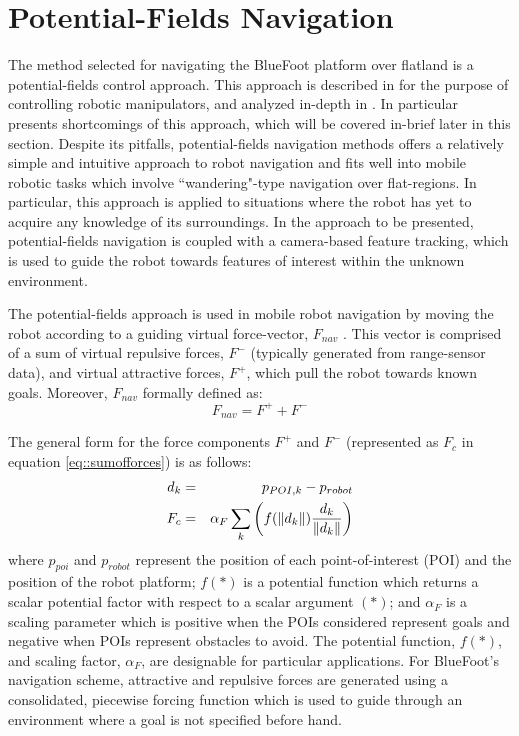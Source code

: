 	\section{Potential-Fields Navigation}

		The method selected for navigating the BlueFoot platform over flatland is a potential-fields control approach. This approach is described in \cite{Hogan1984} for the purpose of controlling robotic manipulators, and analyzed in-depth in \cite{Koren1991}. In particular \cite{Koren1991} presents shortcomings of this approach, which will be covered in-brief later in this section. Despite its pitfalls, potential-fields navigation methods offers a relatively simple and intuitive approach to robot navigation and fits well into mobile robotic tasks which involve ``wandering"-type navigation over flat-regions. In particular, this approach is applied to situations where the robot has yet to acquire any knowledge of its surroundings. In the approach to be presented, potential-fields navigation is coupled with a camera-based feature tracking, which is used to guide the robot towards features of interest within the unknown environment.

		The potential-fields approach is used in mobile robot navigation by moving the robot according to a guiding virtual force-vector, $F_{nav}$ \cite{Koren1991,ArambulaCosio2004}. This vector is comprised of a sum of virtual repulsive forces, $F^{-}$ (typically generated from range-sensor data), and virtual attractive forces, $F^{+}$, which pull the robot towards known goals. Moreover, $F_{nav}$ formally defined as:
		\begin{equation}
			F_{nav} = F^{+} + F^{-}
			\label{eq::sumofforces}
		\end{equation}

		The general form for the force components $F^{+}$ and $F^{-}$ (represented as $F_{c}$ in equation \ref{eq::sumofforces}) is as follows:
		\begin{eqnarray}
			d_{k} 	&=& p_{POI,k} - p_{robot} \nonumber\\
			F_{c}	&=& \alpha_{F}\sum_{k}\left( f(\left\lVert d_{k}\right\rVert)\frac{d_{k}}{\left\lVert d_{k}\right\rVert} \right)
			\label{eq::sumofforces}
		\end{eqnarray}	
		where $p_{poi}$ and $p_{robot}$ represent the position of each \Kth point-of-interest (POI) and the position of the robot platform; $f(*)$ is a potential function which returns a scalar potential factor with respect to a scalar argument $(*)$; and $\alpha_{F}$ is a scaling parameter which is positive when the POIs considered represent goals and negative when POIs represent obstacles to avoid. The potential function, $f(*)$, and scaling factor, $\alpha_{F}$, are designable for particular applications. For BlueFoot's navigation scheme, attractive and repulsive forces are generated using a consolidated, piecewise forcing function which is used to guide through an environment where a goal is not specified before hand. 

